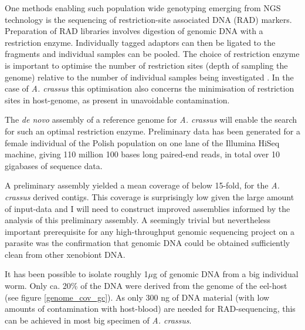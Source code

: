 One methods enabling such population wide genotyping emerging from NGS
technology is the sequencing of restriction-site associated DNA (RAD)
markers. Preparation of RAD libraries involves digestion of genomic
DNA with a restriction enzyme. Individually tagged adaptors can then
be ligated to the fragments and individual samples can be pooled. The
choice of restriction enzyme is important to optimise the number of
restriction sites (depth of sampling the genome) relative to the
number of individual samples being investigated
\cite{pmid18852878}. In the case of \textit{A. crassus} this
optimisation also concerns the minimisation of restriction sites in
host-genome, as present in unavoidable contamination. 

The \textit{de novo} assembly of a reference genome for
\textit{A. crassus} will enable the search for such an optimal
restriction enzyme. Preliminary data has been generated for a female
individual of the Polish population on one lane of the Illumina HiSeq
machine, giving 110 million 100 bases long paired-end reads, in total
over 10 gigabases of sequence data.

A preliminary assembly yielded a mean coverage of below 15-fold, for
the \textit{A. crassus} derived contigs. This coverage is surprisingly
low given the large amount of input-data and I will need to construct
improved assemblies informed by the analysis of this preliminary
assembly. A seemingly trivial but nevertheless important prerequisite
for any high-throughput genomic sequencing project on a parasite was
the confirmation that genomic DNA could be obtained sufficiently clean
from other xenobiont DNA.


It has been possible to isolate roughly 1$\mu$g of genomic DNA from a
big individual worm. Only ca. 20\% of the DNA were derived from the
genome of the eel-host (see figure \ref{genome_cov_gc}). As only 300
ng of DNA material (with low amounts of contamination with host-blood)
are needed for RAD-sequencing, this can be achieved in most big
specimen of \textit{A. crassus}.

